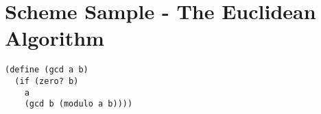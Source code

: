 \documentclass{article}
\begin{document}
\section{Scheme Sample - The Euclidean Algorithm}
\begin{verbatim}
(define (gcd a b)
  (if (zero? b)
    a
    (gcd b (modulo a b))))
\end{verbatim}
\end{document}
